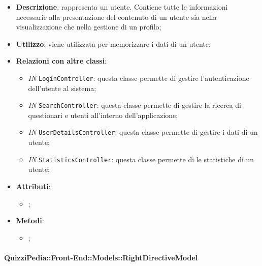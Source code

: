		\begin{itemize}
			\item \textbf{Descrizione}: rappresenta un utente. Contiene tutte le informazioni necessarie alla
			presentazione del contenuto di un utente sia nella visualizzazione che nella gestione di un profilo;
			\item \textbf{Utilizzo}: viene utilizzata per memorizzare i dati di un utente;
			\item \textbf{Relazioni con altre classi}: 
			\begin{itemize}
				\item \textit{IN} \texttt{LoginController}: questa classe permette di gestire l'autenticazione dell'utente al sistema;
				\item \textit{IN} \texttt{SearchController}: questa classe permette di gestire la ricerca di questionari e utenti all'interno dell'applicazione;
				\item \textit{IN} \texttt{UserDetailsController}: questa classe permette di gestire i dati di un utente;
				\item \textit{IN} \texttt{StatisticsController}: questa classe permette di le statistiche di un utente;
			\end{itemize}
			\item \textbf{Attributi}: 
			\begin{itemize}
				\item ;
			\end{itemize}
			\item \textbf{Metodi}: 
			\begin{itemize}
				\item ;
			\end{itemize}
		\end{itemize}		
		
		
		\paragraph{QuizziPedia::Front-End::Models::RightDirectiveModel}
		
		\label{QuizziPedia::Front-End::Models::RightDirectiveModel}
		
		
